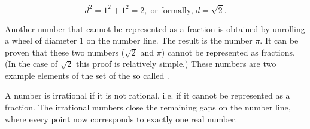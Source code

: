 \begin{MIntro}
\begin{minipage}{0.45\linewidth}
\begin{center}
\end{center}
\end{minipage}
\begin{minipage}{0.55\linewidth}
\begin{center}
$$d^2 = 1^2+1^2 = 2, \;\mbox{or\ formally,}\; d=\sqrt{2}.$$
\end{center}
\end{minipage}

\vspace*{5mm}

Another number that cannot be represented as a fraction is obtained by unrolling a wheel of diameter $1$ 
on the number line. The result is the number $\pi$. It can be proven that these two numbers ($\sqrt{2}$ and $\pi$)
cannot be represented as fractions. (In the case of $\sqrt{2}$ this proof is relatively simple.) These numbers are two 
example elements of the set of the so called .

\vspace*{5mm}

\begin{center}
\end{center}

A number is irrational if it is not rational, i.e. if it cannot be represented as a fraction.
The irrational numbers close the remaining gaps on the number line, where every point now
corresponds to exactly one real number. 


\end{MIntro}
